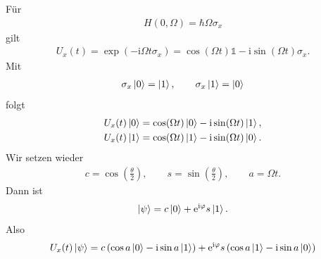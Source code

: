 \documentclass[11pt,a4paper]{scrartcl}
\newcommand{\e}{\mathrm e}
\newcommand{\ii}{\mathrm i}
\begin{document}
\begin{enumerate}[label=(\alph*)]
\begin{calculationbox}
            \begin{calculationbox}[title=Zeitentwicklung um die $x$-Achse]
                Für
                \begin{align*}
                    H(0,\Omega)=\hbar\Omega\sigma_x
                \end{align*}
                gilt
                \begin{align*}
                    U_x(t)
                    =
                    \exp(-\ii\Omega t\sigma_x)
                    =
                    \cos(\Omega t)\mathbb{1}
                    -
                    \ii\sin(\Omega t)\sigma_x.
                \end{align*}
                Mit
                \begin{align*}
                    \sigma_x\ket{0}=\ket{1},
                    \qquad
                    \sigma_x\ket{1}=\ket{0}
                \end{align*}
                folgt
                \begin{align*}
                    U_x(t)\ket{0}
                    &=
                    \cos(\Omega t)\ket{0}
                    -
                    \ii\sin(\Omega t)\ket{1},
                    \\
                    U_x(t)\ket{1}
                    &=
                    \cos(\Omega t)\ket{1}
                    -
                    \ii\sin(\Omega t)\ket{0}.
                \end{align*}
                Wir setzen wieder
                \begin{align*}
                    c=\cos\left(\frac{\theta}{2}\right),
                    \qquad
                    s=\sin\left(\frac{\theta}{2}\right),
                    \qquad
                    a=\Omega t.
                \end{align*}
                Dann ist
                \begin{align*}
                    \ket{\psi}
                    =
                    c\ket{0}
                    +
                    \e^{\ii\varphi}s\ket{1}.
                \end{align*}
                Also
                \begin{align*}
                    U_x(t)\ket{\psi}
                    &=
                    c\left(\cos a\ket{0}-\ii\sin a\ket{1}\right)
                    +
                    \e^{\ii\varphi}s
                    \left(\cos a\ket{1}-\ii\sin a\ket{0}\right)\\

\end{align*}
\end{calculationbox}
\end{calculationbox}
\end{enumerate}
\end{document}
